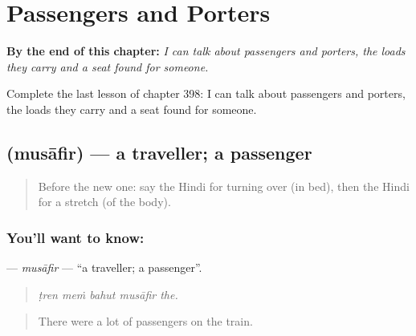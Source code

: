 
\chapter{Passengers and Porters}
\label{ch:hi-passengers-and-porters}

\begin{chapteropening}
\textbf{By the end of this chapter:} \emph{I can talk about passengers and porters, the loads they carry and a seat found for someone.}

Complete the last lesson of chapter 398: I can talk about passengers and porters, the loads they carry and a seat found for someone.
\end{chapteropening}

\section[\texorpdfstring{\hi{मुसाफ़िर} (musāfir)}{मुसाफ़िर (musāfir)}]{ (musāfir) — a traveller; a passenger}

\label{lesson:HI-C398-musafir}



\begin{quote}
Before the new one: say the Hindi for turning over (in bed), then the Hindi for a stretch (of the body).
\end{quote}

\subsection*{You'll want to know: }
\textbf{} — \emph{musāfir} — \textquotedblleft{}a traveller; a passenger\textquotedblright{}.

\begin{quote}
    
\end{quote}

\begin{quote}
\emph{ṭren meṁ bahut musāfir the.}
\end{quote}

\begin{quote}
There were a lot of passengers on the train.
\end{quote}

